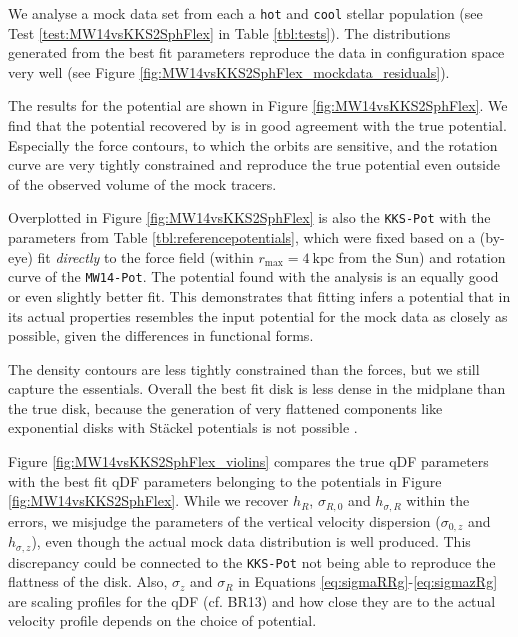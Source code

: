 





We analyse a mock data set from each a \texttt{hot} and \texttt{cool} stellar population (see Test \ref{test:MW14vsKKS2SphFlex} in Table \ref{tbl:tests}). The distributions generated from the best fit parameters reproduce the data in configuration space very well (see Figure \ref{fig:MW14vsKKS2SphFlex_mockdata_residuals}).

The results for the potential are shown in Figure \ref{fig:MW14vsKKS2SphFlex}. We find that the potential recovered by \RM{} is in good agreement with the true potential. Especially the force contours, to which the orbits are sensitive, and the rotation curve are very tightly constrained and reproduce the true potential even outside of the observed volume of the mock tracers.

Overplotted in Figure \ref{fig:MW14vsKKS2SphFlex} is also the \texttt{KKS-Pot} with the parameters from Table \ref{tbl:referencepotentials}, which were fixed based on a (by-eye) fit \emph{directly} to the force field (within $r_\text{max}=4~\text{kpc}$ from the Sun) and rotation curve of the \texttt{MW14-Pot}. The potential found with the \RM{} analysis is an equally good or even slightly better fit. This demonstrates that \RM{} fitting infers a potential that in its actual properties resembles the input potential for the mock data as closely as possible, given the differences in functional forms.

The density contours are less tightly constrained than the forces, but we still capture the essentials. Overall the best fit disk is less dense in the midplane than the true disk, because the generation of very flattened components like exponential disks with St\"{a}ckel potentials is not possible .


Figure \ref{fig:MW14vsKKS2SphFlex_violins} compares the true qDF parameters with the best fit qDF parameters belonging to the potentials in Figure \ref{fig:MW14vsKKS2SphFlex}. While we recover $h_R$, $\sigma_{R,0}$ and $h_{\sigma,R}$ within the errors, we misjudge the parameters of the vertical velocity dispersion ($\sigma_{0,z}$ and $h_{\sigma,z}$), even though the actual mock data distribution is well produced. This discrepancy could be connected to the \texttt{KKS-Pot} not being able to reproduce the flattness of the disk. Also, $\sigma_z$ and $\sigma_R$ in Equations \ref{eq:sigmaRRg}-\ref{eq:sigmazRg} are scaling profiles for the qDF (cf. BR13) and how close they are to the actual velocity profile depends on the choice of potential.










